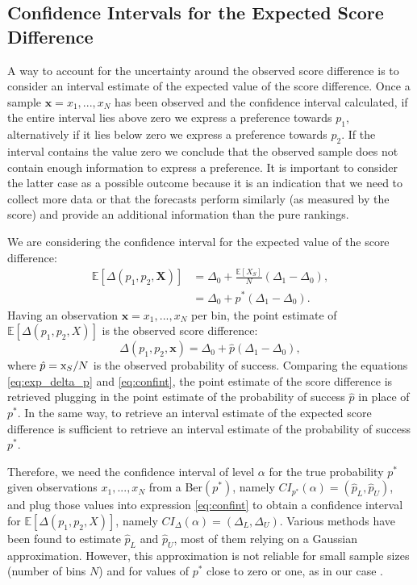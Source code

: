 \documentclass[referee,sn-basic]{sn-jnl}
\theoremstyle{thmstyleone}%
\theoremstyle{thmstyletwo}%
\theoremstyle{thmstylethree}%
\begin{document}
\subsection{ Confidence Intervals for the Expected Score Difference }

A way to account for the uncertainty around the observed score difference is to consider an interval estimate of the expected value of the score difference. Once a sample $\mathbf x = x_1,...,x_N$ has been observed and the confidence interval calculated, if the entire interval lies above zero we express a preference towards $p_1$, alternatively if it lies below zero we express a preference towards $p_2$. If the interval contains the value zero we conclude that the observed sample does not contain enough information to express a preference. It is important to consider the latter case as a possible outcome because it is an indication that we need to collect more data or that the forecasts perform similarly (as measured by the score) and provide an additional information than the pure rankings. 

We are considering the confidence interval for the expected value of the score difference:
\begin{align}
\mathbb E[\Delta(p_1, p_2, \mathbf X)] &= \Delta_0 + \frac{\mathbb E[X_S]}{N}(\Delta_1 - \Delta_0), \nonumber\\ 
&= \Delta_0 + p^*(\Delta_1 - \Delta_0).
\label{eq:exp_delta_p}
\end{align}
Having an observation $\mathbf x = x_1,...,x_N$ per bin, the point estimate of $\mathbb E[\Delta(p_1, p_2, X)]$ is the observed score difference:
\begin{equation}
\Delta(p_1,p_2,\mathbf x) = \Delta_0 + \hat p (\Delta_1 - \Delta_0),
\label{eq:confint}
\end{equation}
where $\hat p = \text x_S/N$ is the observed probability of success. Comparing the equations \ref{eq:exp_delta_p} and \ref{eq:confint}, the point estimate of the score difference is retrieved plugging in the point estimate of the probability of success $\hat p$ in place of $p^*$. In the same way, to retrieve an interval estimate of the expected score difference is sufficient to retrieve an interval estimate of the probability of success $p^*$.  

Therefore, we need the confidence interval of level $\alpha$ for the true probability $p^*$ given observations $x_1,...,x_N$ from a Ber$(p^*)$, namely $CI_{p^*}(\alpha) = (\hat p_L, \hat p_U)$, and plug those values into expression \ref{eq:confint} to obtain a confidence interval for $\mathbb E[\Delta(p_1, p_2, X)]$, namely $CI_{\Delta}(\alpha) = (\Delta_L, \Delta_U)$. Various methods have been found to estimate $\hat p_L$ and $\hat p_U$, most of them relying on a Gaussian approximation. However, this approximation is not reliable for small sample sizes (number of bins $N$) and for values of $p^*$ close to zero or one, as in our case \citep{wallis2013binomial}. 
\end{document}
